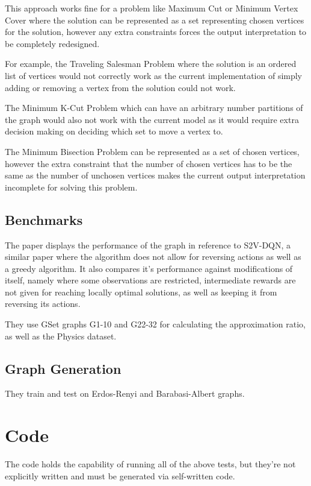 \documentclass{article}
\begin{document}
This approach works fine for a problem like Maximum Cut or Minimum Vertex Cover where the solution can be represented as a set representing chosen vertices for the solution, however any extra constraints forces the output interpretation to be completely redesigned.

For example, the Traveling Salesman Problem where the solution is an ordered list of vertices would not correctly work as the current implementation of simply adding or removing a vertex from the solution could not work.

The Minimum K-Cut Problem which can have an arbitrary number partitions of the graph would also not work with the current model as it would require extra decision making on deciding which set to move a vertex to.

The Minimum Bisection Problem can be represented as a set of chosen vertices, however the extra constraint that the number of chosen vertices has to be the same as the number of unchosen vertices makes the current output interpretation incomplete for solving this problem.

\subsection{Benchmarks}

The paper displays the performance of the graph in reference to S2V-DQN, a similar paper where the algorithm does not allow for reversing actions as well as a greedy algorithm. It also compares it's performance against modifications of itself, namely where some observations are restricted, intermediate rewards are not given for reaching locally optimal solutions, as well as keeping it from reversing its actions. 

They use GSet graphs G1-10 and G22-32 for calculating the approximation ratio, as well as the Physics dataset. 

\subsection{Graph Generation}

They train and test on Erdos-Renyi \cite{erdos} and Barabasi-Albert \cite{albert} graphs.

\section{Code}

The code holds the capability of running all of the above tests, but they're not explicitly written and must be generated via self-written code.
\end{document}
